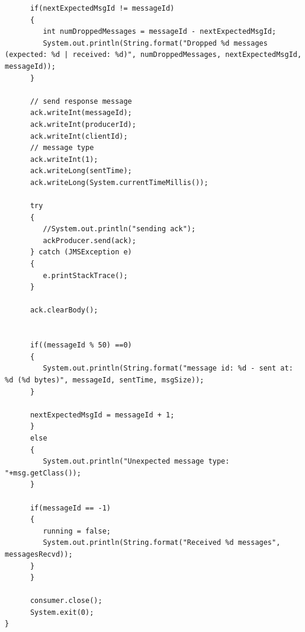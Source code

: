 \documentclass{thesis}
\begin{document}
\begin{lstlisting}
      if(nextExpectedMsgId != messageId)
      {
         int numDroppedMessages = messageId - nextExpectedMsgId;
         System.out.println(String.format("Dropped %d messages (expected: %d | received: %d)", numDroppedMessages, nextExpectedMsgId, messageId));
      }
            		
      // send response message
      ack.writeInt(messageId);
      ack.writeInt(producerId);
      ack.writeInt(clientId);
      // message type
      ack.writeInt(1);
      ack.writeLong(sentTime);
      ack.writeLong(System.currentTimeMillis());

      try 
      {
         //System.out.println("sending ack");
         ackProducer.send(ack);
      } catch (JMSException e) 
      {
         e.printStackTrace();
      }
    			
      ack.clearBody();
            	
            	
      if((messageId % 50) ==0)
      {
         System.out.println(String.format("message id: %d - sent at: %d (%d bytes)", messageId, sentTime, msgSize));
      }
            	
      nextExpectedMsgId = messageId + 1;
      }
      else 
      {
         System.out.println("Unexpected message type: "+msg.getClass());
      }
                          
      if(messageId == -1)
      {
         running = false;
         System.out.println(String.format("Received %d messages", messagesRecvd));
      }            
      }
        
      consumer.close();
      System.exit(0);    
}
\end{lstlisting}
\end{document}
